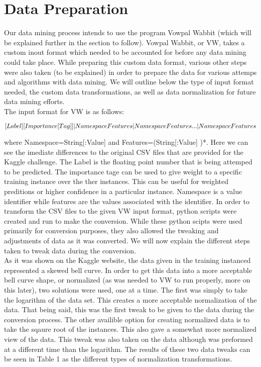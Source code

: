 \section{Data Preparation}

Our data mining process intends to use the program Vowpal Wabbit (which will be explained further in the section to follow). Vowpal Wabbit,
or VW, takes a custom inout format which needed to be accounted for before any data mining could take place. While preparing this custom
data format, various other steps were also taken (to be explained) in order to prepare the data for various attemps and algorithms with
data mining. We will outline below the type of input format needed, the custom data transformations, as well as data normalization for
future data mining efforts.\\

The input format for VW is as follows:

\begin{equation}
\label{eq:input}
\tiny
[Label][Importance [Tag]]|Namespace Features|Namespace Features...|Namespace Features
\end{equation}

where Namespace=String[:Value] and Features=(String[:Value] )*. Here we can see the imediate differences to the original CSV files that
are provided for the Kaggle challenge. The Label is the floating point number that is being attemped to be predicted. The importance
tage can be used to give weight to a specific training instance over the ther instances. This can be useful for weighted preditions
or higher confidence in a particular instance. Namespace is a value identifier while features are the values associated with the identifier.
In order to transform the CSV files to the given VW input format, python scripts were created and run to make the conversion. While
these python scipts were used primarily for conversion purposes, they also allowed the tweaking and adjustments of data as it was converted.
We will now explain the different steps taken to tweak data during the conversion.\\

As it was shown on the Kaggle website, the data given in the training instanced represented a skewed bell curve. In order to get
this data into a more acceptable bell curve shape, or normalized (as was needed to VW to run properly, more on this later), two
solutions were used, one at a time. The first was simply to take the logarithm of the data set. This creates a more acceptable
normalization of the data. That being said, this was the first tweak to be given to the data during the conversion process. The other
availible option for creating normalized data is to take the sqaure root of the instances. This also gave a somewhat more normalized
view of the data. This tweak was also taken on the data although was preformed at a different time than the logarithm. The results
of these two data tweaks can be seen in Table 1 as the different types of normalization transformations.\\

